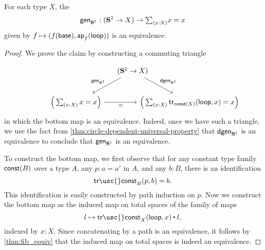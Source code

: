 \begin{thm}\label{thm:circle_up} 
For each type $X$, the 
\begin{equation*}
\mathsf{gen}_{\sphere{1}}:(\sphere{1}\to X)\to \sm{x:X}x=x
\end{equation*}
given by $f\mapsto (f(\mathsf{base}),\mathsf{ap}_{f}({\mathsf{loop}}))$ is an equivalence.
\end{thm}

\begin{proof}
  We prove the claim by constructing a commuting triangle
  \begin{equation*}
    \begin{tikzcd}[column sep=-2em]
      \phantom{\Big(\sm{x:X}\tr_{\const(X)}(\lloop,x)=x\Big)} & (\sphere{1}\to X) \arrow[dl,swap,"\gen_{\sphere{1}}"] \arrow[dr,"\dgen_{\sphere{1}}"] \\
      \Big(\sm{x:X}x=x\Big) \arrow[rr,swap,"\simeq"] & & \Big(\sm{x:X}\tr_{\const(X)}(\lloop,x)=x\Big)
    \end{tikzcd}
  \end{equation*}
  in which the bottom map is an equivalence. Indeed, once we have such a triangle, we use the fact from \cref{thm:circle-dependent-universal-property} that $\mathsf{dgen}_{\mathbf{S}^{1}}$ is an equivalence to conclude that $\mathsf{gen}_{\mathbf{S}^{1}}$ is an equivalence.

  To construct the bottom map, we first observe that for any constant type family $\mathsf{const}(B)$ over a type $A$, any $p:a=a'$ in $A$, and any $b:B$, there is an identification
  \begin{equation*}
    \mathsf{tr\usc{}const}_B(p,b)=b.
  \end{equation*}
  This identification is easily constructed by path induction on $p$. Now we construct the bottom map as the induced map on total spaces of the family of maps
  \begin{equation*}
    l\mapsto \ct{\mathsf{tr\usc{}const}_X(\lloop,x)}{l},
  \end{equation*}
  indexed by $x:X$. Since concatenating by a path is an equivalence, it follows by \cref{thm:fib_equiv} that the induced map on total spaces is indeed an equivalence.


\end{proof}

